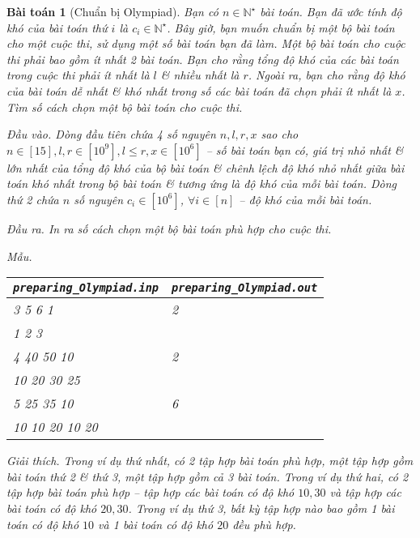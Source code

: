 \documentclass{article}
\newtheorem{baitoan}{Bài toán}
\begin{document}
\begin{baitoan}[Chuẩn bị Olympiad]
    Bạn có $n\in\mathbb{N}^\star$ bài toán. Bạn đã ước tính độ khó của bài toán thứ $i$ là $c_i\in\mathbb{N}^\star$. Bây giờ, bạn muốn chuẩn bị một bộ bài toán cho một cuộc thi, sử dụng một số bài toán bạn đã làm. Một bộ bài toán cho cuộc thi phải bao gồm ít nhất 2 bài toán. Bạn cho rằng tổng độ khó của các bài toán trong cuộc thi phải ít nhất là $l$ \& nhiều nhất là $r$. Ngoài ra, bạn cho rằng độ khó của bài toán dễ nhất \& khó nhất trong số các bài toán đã chọn phải ít nhất là $x$. Tìm số cách chọn một bộ bài toán cho cuộc thi.

    \item {\sf Đầu vào.} Dòng đầu tiên chứa 4 số nguyên $n,l,r,x$ sao cho $n\in[15],l,r\in[10^9],l\le r,x\in[10^6]$ -- số bài toán bạn có, giá trị nhỏ nhất \& lớn nhất của tổng độ khó của bộ bài toán \& chênh lệch độ khó nhỏ nhất giữa bài toán khó nhất trong bộ bài toán \& tương ứng là độ khó của mỗi bài toán. Dòng thứ 2 chứa $n$ số nguyên $c_i\in[10^6]$, $\forall i\in[n]$ -- độ khó của mỗi bài toán.
    \item {\sf Đầu ra.} In ra số cách chọn một bộ bài toán phù hợp cho cuộc thi.
    \item {\sf Mẫu.}
    \begin{table}[H]
        \centering
        \begin{tabular}{|l|l|}
            \hline
            \verb|preparing_Olympiad.inp| & \verb|preparing_Olympiad.out| \\
            \hline
            3 5 6 1 & 2 \\
            1 2 3 & \\
            \hline
            4 40 50 10 & 2 \\
            10 20 30 25 & \\
            \hline
            5 25 35 10 & 6 \\
            10 10 20 10 20 & \\
            \hline
        \end{tabular}
    \end{table}
    \item {\sf Giải thích.} Trong ví dụ thứ nhất, có 2 tập hợp bài toán phù hợp, một tập hợp gồm bài toán thứ 2 \& thứ 3, một tập hợp gồm cả 3 bài toán. Trong ví dụ thứ hai, có 2 tập hợp bài toán phù hợp -- tập hợp các bài toán có độ khó $10,30$ và tập hợp các bài toán có độ khó $20,30$. Trong ví dụ thứ 3, bất kỳ tập hợp nào bao gồm 1 bài toán có độ khó $10$ và 1 bài toán có độ khó $20$ đều phù hợp.
\end{baitoan}
\end{document}

